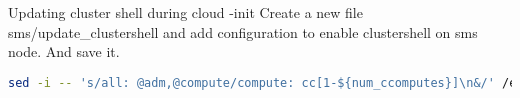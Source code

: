 Updating cluster shell during cloud -init
Create a new file sms/update\_clustershell and add configuration to enable clustershell on sms node. And save it. 


\begin{lstlisting}[language=bash,keywords={}]
sed -i -- 's/all: @adm,@compute/compute: cc[1-${num_ccomputes}]\n&/' /etc/clustershell/groups.d/local.cfg
\end{lstlisting}